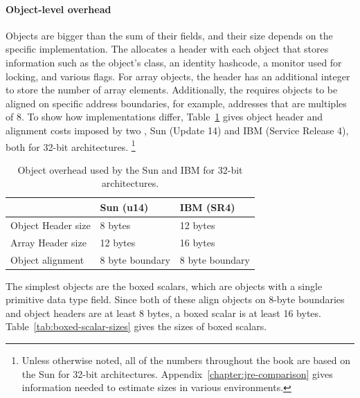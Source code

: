 \paragraph{Object-level overhead} Objects are bigger than the sum of their
fields, and their size depends on the specific \jre implementation. The \jre allocates a header with each object that
stores information such as the object's class, an identity hashcode, a monitor
used for locking, and various flags. For array objects, the header has an
additional integer to store the number of array elements. Additionally,  the
\jre requires objects to be aligned on specific address boundaries, for example,
addresses that are multiples of 8. To show how implementations differ,
Table~\ref{tab:object-overhead} gives object header and alignment costs imposed
by two \jres, Sun \javasix (Update 14) and IBM \javasix (Service Release 4),
both for 32-bit architectures. \footnote{Unless otherwise noted, all of the
numbers throughout the book are based on the Sun \jre for 32-bit architectures.
Appendix~\ref{chapter:jre-comparison} gives information needed to estimate
sizes in various environments.}
\begin{table}
  \centering
 \begin{tabular}{lll} \toprule
 	& Sun \javasix (u14) & IBM \javasix (SR4) \\ \midrule
 	Object Header size & 8 bytes & 12 bytes \\
 	Array Header size & 12 bytes & 16 bytes \\
 	Object alignment & 8 byte boundary & 8 byte boundary \\
 	\bottomrule
 \end{tabular}
  \caption{Object overhead used by the Sun and IBM \jres for 32-bit architectures.}
  \label{tab:object-overhead}
\end{table} 
   
The simplest objects are the boxed scalars, which are objects with a single
primitive data type field. Since both of these \jres align objects on
8-byte boundaries and object headers are at least 8 bytes, a boxed scalar is at
least 16 bytes. Table~\ref{tab:boxed-scalar-sizes} gives the sizes of boxed
scalars.

